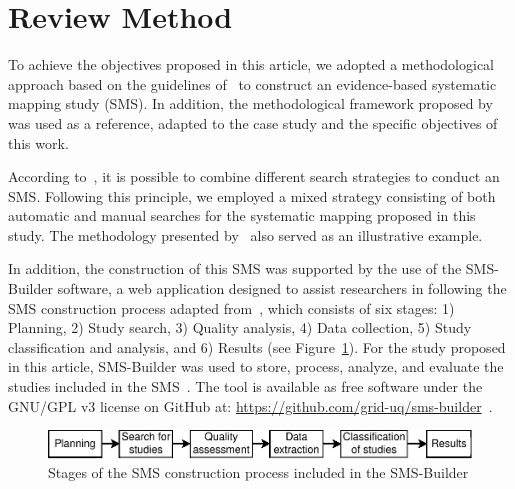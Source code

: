 \section{Review Method}\label{sec:metodo-revision}

To achieve the objectives proposed in this article, we adopted a methodological approach based on the guidelines of~\cite{Kitchenham2010792, budgen2008using} to construct an evidence-based systematic mapping study (SMS). In addition, the methodological framework proposed by~\cite{Sepúlveda202141} was used as a reference, adapted to the case study and the specific objectives of this work.

According to~\cite{Erica2017HybridSS, Nguyen201562}, it is possible to combine different search strategies to conduct an SMS. Following this principle, we employed a mixed strategy consisting of both automatic and manual searches for the systematic mapping proposed in this study. The methodology presented by~\cite{Ali201988196} also served as an illustrative example.

In addition, the construction of this SMS was supported by the use of the SMS-Builder software, a web application designed to assist researchers in following the SMS construction process adapted from~\cite{Kitchenham2010792}, which consists of six stages: 1) Planning, 2) Study search, 3) Quality analysis, 4) Data collection, 5) Study classification and analysis, and 6) Results (see Figure~\ref{figure:Stages}). For the study proposed in this article, SMS-Builder was used to store, process, analyze, and evaluate the studies included in the SMS~\cite{Candela2022100935}. The tool is available as free software under the GNU/GPL v3 license on GitHub at: \url{https://github.com/grid-uq/sms-builder}~\cite{Candela2022100935}.

\begin{figure}
	\centering
	\includegraphics[scale=1.1]{resources/figures/sms-Etapas.eps}
	\caption{Stages of the SMS construction process included in the SMS-Builder}
	\label{figure:Stages}
\end{figure}














